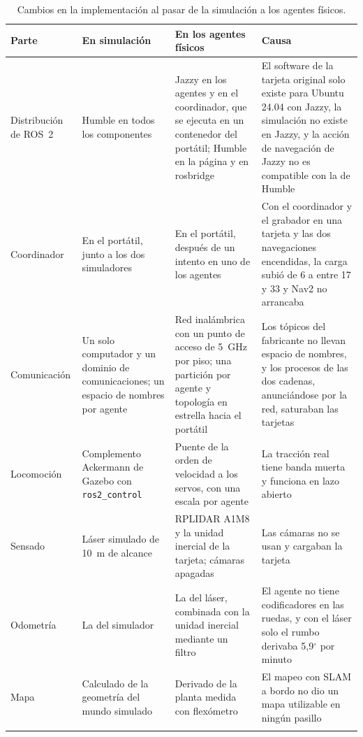 \begin{table}[htbp]
  \centering\footnotesize
  \caption{Cambios en la implementación al pasar de la simulación a los agentes físicos.}
  \label{tab:sim-vehiculos}
  \begin{tabular}{@{}p{}p{}p{}p{}@{}}
    \toprule
    \textbf{Parte} & \textbf{En simulación} & \textbf{En los agentes físicos} & \textbf{Causa} \\ \midrule
    Distribución de ROS~2 & Humble en todos los componentes & Jazzy en los agentes y en el coordinador, que se ejecuta en un contenedor del portátil; Humble en la página y en rosbridge & El software de la tarjeta original solo existe para Ubuntu 24.04 con Jazzy, la simulación no existe en Jazzy, y la acción de navegación de Jazzy no es compatible con la de Humble \\ \addlinespace
    Coordinador & En el portátil, junto a los dos simuladores & En el portátil, después de un intento en uno de los agentes & Con el coordinador y el grabador en una tarjeta y las dos navegaciones encendidas, la carga subió de 6 a entre 17 y 33 y Nav2 no arrancaba \\ \addlinespace
    Comunicación & Un solo computador y un dominio de comunicaciones; un espacio de nombres por agente & Red inalámbrica con un punto de acceso de 5~GHz por piso; una partición por agente y topología en estrella hacia el portátil & Los tópicos del fabricante no llevan espacio de nombres, y los procesos de las dos cadenas, anunciándose por la red, saturaban las tarjetas \\ \addlinespace
    Locomoción & Complemento Ackermann de Gazebo con \texttt{ros2\_control} & Puente de la orden de velocidad a los servos, con una escala por agente & La tracción real tiene banda muerta y funciona en lazo abierto \\ \addlinespace
    Sensado & Láser simulado de 10~m de alcance & RPLIDAR A1M8 y la unidad inercial de la tarjeta; cámaras apagadas & Las cámaras no se usan y cargaban la tarjeta \\ \addlinespace
    Odometría & La del simulador & La del láser, combinada con la unidad inercial mediante un filtro & El agente no tiene codificadores en las ruedas, y con el láser solo el rumbo derivaba 5,9$^\circ$ por minuto \\ \addlinespace
    Mapa & Calculado de la geometría del mundo simulado & Derivado de la planta medida con flexómetro & El mapeo con SLAM a bordo no dio un mapa utilizable en ningún pasillo \\ \addlinespace

\end{tabular}
\end{table}
